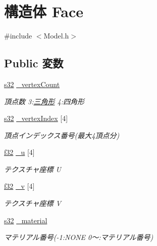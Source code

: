 \hypertarget{struct_face}{\section{構造体 Face}
\label{struct_face}
}


{\ttfamily \#include $<$Model.\-h$>$}

\subsection*{Public 変数}
\begin{DoxyCompactItemize}
\item 
\hyperlink{_main_8h_a0ce6887c26c1c49ad3be5710dd42bfd6}{s32} \hyperlink{struct_face_ae66e1226046adc0fbeaa6db936646a65}{\-\_\-vertex\-Count}
\begin{DoxyCompactList}\small\item\em 頂点数 3\-:\hyperlink{struct_xE4_xB8_x89_xE8_xA7_x92_xE5_xBD_xA2}{三角形} 4\-:四角形 \end{DoxyCompactList}\item 
\hyperlink{_main_8h_a0ce6887c26c1c49ad3be5710dd42bfd6}{s32} \hyperlink{struct_face_aceddde235971938cc165b5f7c9440b99}{\-\_\-vertex\-Index} \mbox{[}4\mbox{]}
\begin{DoxyCompactList}\small\item\em 頂点インデックス番号(最大4頂点分) \end{DoxyCompactList}\item 
\hyperlink{_main_8h_a5f6906312a689f27d70e9d086649d3fd}{f32} \hyperlink{struct_face_ac67b514483b1fed58ab7d2fc04da56a4}{\-\_\-u} \mbox{[}4\mbox{]}
\begin{DoxyCompactList}\small\item\em テクスチャ座標 U \end{DoxyCompactList}\item 
\hyperlink{_main_8h_a5f6906312a689f27d70e9d086649d3fd}{f32} \hyperlink{struct_face_a16c195e7ec3ead4c46eb17fd9bb6bf75}{\-\_\-v} \mbox{[}4\mbox{]}
\begin{DoxyCompactList}\small\item\em テクスチャ座標 V \end{DoxyCompactList}\item 
\hyperlink{_main_8h_a0ce6887c26c1c49ad3be5710dd42bfd6}{s32} \hyperlink{struct_face_aa8ce2f4fdf76dcab7a3dbed87ad3fbb1}{\-\_\-material}
\begin{DoxyCompactList}\small\item\em マテリアル番号(-\/1\-:N\-O\-N\-E 0〜\-:マテリアル番号) \end{DoxyCompactList}\end{DoxyCompactItemize}



